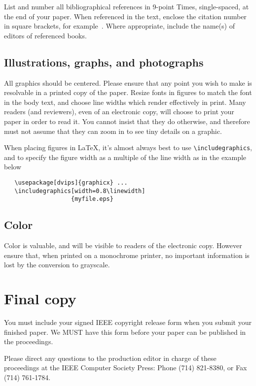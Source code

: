 \documentclass[10pt,twocolumn,letterpaper]{article}
\begin{document}
List and number all bibliographical references in 9-point Times,
single-spaced, at the end of your paper. When referenced in the text,
enclose the citation number in square brackets, for
example~\cite{Authors06}.  Where appropriate, include the name(s) of
editors of referenced books.

\subsection{Illustrations, graphs, and photographs}

All graphics should be centered.  Please ensure that any point you wish to
make is resolvable in a printed copy of the paper.  Resize fonts in figures
to match the font in the body text, and choose line widths which render
effectively in print.  Many readers (and reviewers), even of an electronic
copy, will choose to print your paper in order to read it.  You cannot
insist that they do otherwise, and therefore must not assume that they can
zoom in to see tiny details on a graphic.

When placing figures in \LaTeX, it's almost always best to use
\verb+\includegraphics+, and to specify the  figure width as a multiple of
the line width as in the example below
{\small\begin{verbatim}
   \usepackage[dvips]{graphicx} ...
   \includegraphics[width=0.8\linewidth]
                   {myfile.eps}
\end{verbatim}
}


\subsection{Color}

Color is valuable, and will be visible to readers of the electronic copy.
However ensure that, when printed on a monochrome printer, no important
information is lost by the conversion to grayscale.

\section{Final copy}

You must include your signed IEEE copyright release form when you submit
your finished paper. We MUST have this form before your paper can be
published in the proceedings.

Please direct any questions to the production editor in charge of these
proceedings at the IEEE Computer Society Press: Phone (714) 821-8380, or
Fax (714) 761-1784.

{\small


}
\end{document}
